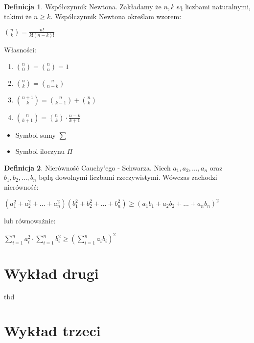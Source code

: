 \documentclass{article}
\theoremstyle{definition}
\newtheorem{de}{Definicja}[subsection]
\theoremstyle{definition}
\theoremstyle{definition}
\theoremstyle{definition}
\begin{document}
\begin{de}
    Współczynnik Newtona. Zakładamy że $n,k$ są liczbami naturalnymi,
    takimi że $n\geq k$. Współczynnik Newtona określam wzorem:
    \begin{center}
        $\binom{n}{k}=\frac{n!}{k!(n-k)!}$
    \end{center}
    Własności:
    \begin{enumerate}
        \item $\binom{n}{0}=\binom{n}{n}=1$
        \item $\binom{n}{k}=\binom{n}{n-k}$
        \item $\binom{n+1}{k}=\binom{n}{k-1}+\binom{n}{k}$
        \item $\binom{n}{k+1}=\binom{n}{k}\cdot \frac{n-k}{k+1}$
    \end{enumerate}
\end{de}

\begin{itemize}
    \item Symbol sumy $\sum$
    \item Symbol iloczynu $\Pi$
\end{itemize}

\begin{de}
    Nierówność Cauchy'ego - Schwarza. Niech $a_1, a_2, \dots, a_n$ oraz $b_1, b_2, \dots, b_n$ będą dowolnymi liczbami rzeczywistymi.
    Wówczas zachodzi nierówność:
    \begin{center}
        $(a_1^2+a_2^2+\dots+a_n^2)(b_1^2+b_2^2+\dots+b_n^2)\geq(a_1b_1+a_2b_2+\dots+a_nb_n)^2$
    \end{center}
    lub równoważnie:
    \begin{center}
        $\sum_{i=1}^{n} a_i^2 \cdot \sum_{i=1}^{n} b_i^2 \geq \left(\sum_{i=1}^{n} a_ib_i\right)^2$
    \end{center}
\end{de}

\section{Wykład drugi}
tbd

\section{Wykład trzeci}
\end{document}

